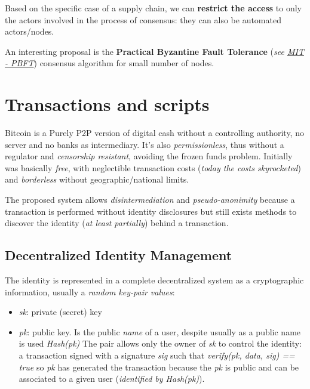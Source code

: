 \documentclass[10pt,a4paper]{report}
\begin{document}
Based on the specific case of a supply chain, we can \textbf{restrict the access} to only the actors involved in the process of consensus: they can also be automated actors/nodes. 

An interesting proposal is the \textbf{Practical Byzantine Fault Tolerance} (\textit{see \href{https://pmg.csail.mit.edu/papers/osdi99.pdf}{MIT - PBFT}}) consensus algorithm for small number of nodes.


\section{Transactions and scripts}\label{sec:transactions-and-scripts}
Bitcoin is a Purely P2P version of digital cash without a controlling authority, no server and no banks as intermediary. It's also \textit{permissionless}, thus without a regulator and \textit{censorship resistant}, avoiding the frozen funds problem.
Initially was basically \textit{free}, with neglectible transaction costs (\textit{today the costs skyrocketed}) and \textit{borderless} without geographic/national limits.


The proposed system allows \textit{disintermediation} and  \textit{pseudo-anonimity} because a transaction is performed without identity disclosures but still exists methods to discover the identity (\textit{at least partially}) behind a transaction.
\subsection{Decentralized Identity Management}\label{sec:decentralized-identity-management}
The identity is represented in a complete decentralized system as a cryptographic information, usually a \textit{random key-pair values}:
\begin{itemize}
	\item 
	\textit{sk}: private (secret) key
	\item 
	\textit{pk}: public key. Is the public \textit{name} of a user, despite usually as a public name is used \textit{Hash(pk)}
	The pair allows only the owner of \textit{sk} to control the identity: a transaction signed with a signature \textit{sig} such that \textit{verify(pk, data, sig) == true} so \textit{pk} has generated the transaction because the \textit{pk} is public and can be associated to a given user (\textit{identified by \textit{Hash(pk)}}).
\end{itemize}
\end{document}
